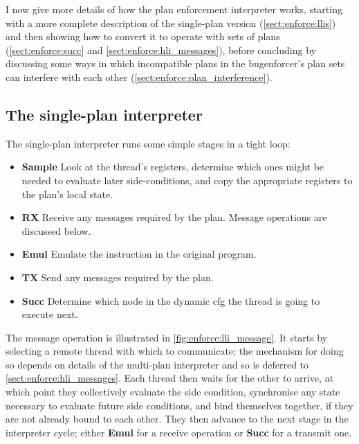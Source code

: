 I now give more details of how the plan enforcement interpreter works,
starting with a more complete description of the single-plan version
(\autoref{sect:enforce:llis}) and then showing how to convert it to
operate with sets of plans (\autoref{sect:enforce:succ} and
\autoref{sect:enforce:hli_messages}), before concluding by discussing
some ways in which incompatible plans in the \gls{bugenforcer}'s plan
sets can interfere with each other
(\autoref{sect:enforce:plan_interference}).

\subsection{The single-plan interpreter}
\label{sect:enforce:llis}

The single-plan interpreter runs some simple stages in a tight loop:
\begin{itemize}
\item \textbf{Sample} Look at the thread's registers, determine which
  ones might be needed to evaluate later side-conditions, and copy the
  appropriate registers to the plan's local state.

\item \textbf{RX} Receive any messages required by the plan.  Message
  operations are discussed below.

\item \textbf{Emul} Emulate the instruction in the original program.

\item \textbf{TX} Send any messages required by the plan.

\item \textbf{Succ} Determine which node in the dynamic \gls{cfg} the
  thread is going to execute next.
\end{itemize}
The message operation is illustrated in
\autoref{fig:enforce:lli_message}.  It starts by selecting a remote
thread with which to communicate; the mechanism for doing so depends
on details of the multi-plan interpreter and so is deferred to
\autoref{sect:enforce:hli_messages}.  Each thread then waits for the
other to arrive, at which point they collectively evaluate the side
condition, synchronise any state necessary to evaluate future side
conditions, and bind themselves together, if they are not already
bound to each other.  They then advance to the next stage in the
interpreter cycle; either \textbf{Emul} for a receive operation or
\textbf{Succ} for a transmit one.

